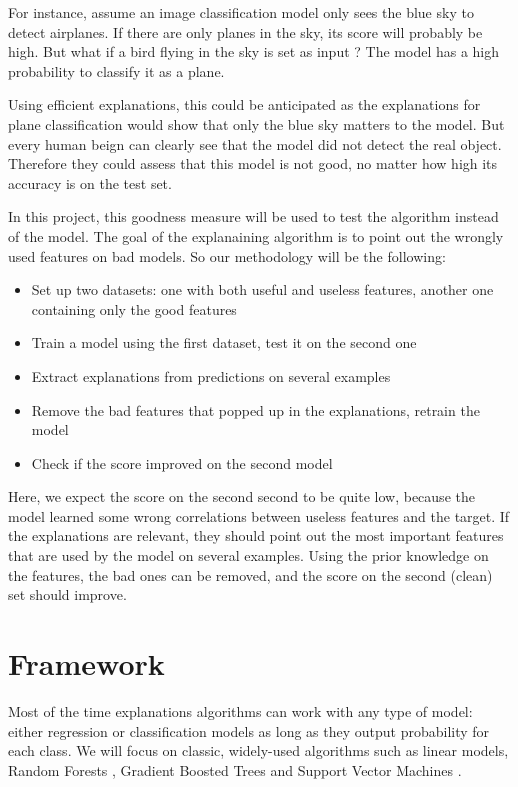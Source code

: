 \documentclass[a4paper,11pt]{kth-mag}
\begin{document}
For instance, assume an image classification model only sees the blue sky to detect airplanes. If there are only planes in the sky, its score will probably be high. But what if a bird flying in the sky is set as input ? The model has a high probability to classify it as a plane.

Using efficient explanations, this could be anticipated as the explanations for plane classification would show that only the blue sky matters to the model. But every human beign can clearly see that the model did not detect the real object. Therefore they could assess that this model is not good, no matter how high its accuracy is on the test set.

In this project, this goodness measure will be used to test the algorithm instead of the model. The goal of the explanaining algorithm is to point out the wrongly used features on bad models. So our methodology will be the following:

\begin{itemize}
	\item Set up two datasets: one with both useful and useless features, another one containing only the good features
	\item Train a model using the first dataset, test it on the second one
	\item Extract explanations from predictions on several examples
	\item Remove the bad features that popped up in the explanations, retrain the model
	\item Check if the score improved on the second model
\end{itemize}

Here, we expect the score on the second second to be quite low, because the model learned some wrong correlations between useless features and the target. If the explanations are relevant, they should point out the most important features that are used by the model on several examples. Using the prior knowledge on the features, the bad ones can be removed, and the score on the second (clean) set should improve.

\section{Framework}

Most of the time explanations algorithms can work with any type of model: either regression or classification models as long as they output probability for each class. We will focus on classic, widely-used algorithms such as linear models, Random Forests \cite{Breiman2001}, Gradient Boosted Trees \cite{Friedman2001} and Support Vector Machines \cite{Vapnik1992}.
\end{document}
